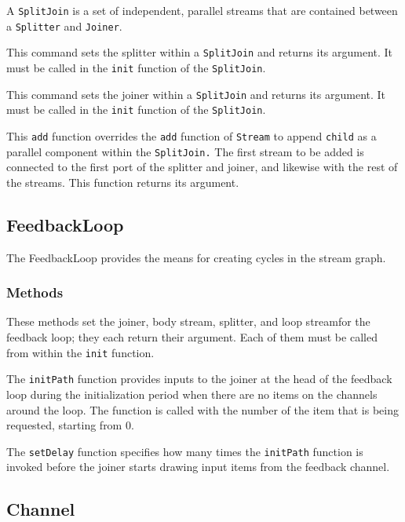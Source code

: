 A {\tt SplitJoin} is a set of independent, parallel streams that are
contained between a {\tt Splitter} and {\tt Joiner}.

  This command sets the splitter within a {\tt SplitJoin} and returns its argument.  It must be called in the {\tt init} function of the {\tt SplitJoin}.

 This command sets the joiner within a {\tt SplitJoin} and returns its argument.  It must be called in the {\tt init} function of the {\tt SplitJoin}.

 This {\tt add} function overrides the {\tt add} function of {\tt Stream} to append {\tt child} as a parallel component within the {\tt SplitJoin.}  The first stream to be added is connected to the first port of the splitter and joiner, and likewise with the rest of the streams.  This function returns its argument.

\subsection{FeedbackLoop}

The FeedbackLoop provides the means for creating cycles in the stream
graph.

\subsubsection{Methods}

 These methods set the joiner, body
stream, splitter, and loop streamfor the feedback loop; they each
return their argument.  Each of them must be called from within the
{\tt init} function.

  The {\tt initPath} function provides inputs to the joiner at the head of the feedback loop during the initialization period when there are no items on the channels around the loop.  The function is called with the number of the item that is being requested, starting from 0.

  The {\tt setDelay} function specifies how many times the {\tt initPath} function is invoked before the joiner starts drawing input items from the feedback channel.

\subsection{Channel}

